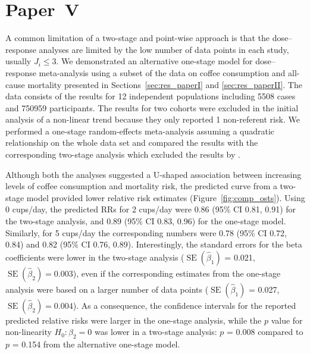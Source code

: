 \documentclass[11pt,a4paper,twoside,openany]{book}\usepackage{knitr}
\DeclareMathOperator{\SE}{SE}
\begin{document}
{\section{Paper~V}



A common limitation of a two-stage and point-wise approach is that the dose--response analyses are limited by the low number of data points in each study, usually $J_i \le 3$. We demonstrated an alternative one-stage model for dose--response meta-analysis using a subset of the data on coffee consumption and all-cause mortality presented in Sections~\ref{sec:res_paperI} and \ref{sec:res_paperII}. The data consists of the results for 12 independent populations including 5508 cases and 750959 participants. The results for two cohorts \citep{nilsson2012traditional} were excluded in the initial analysis of a non-linear trend because they only reported 1 non-referent risk. We performed a one-stage random-effects meta-analysis assuming a quadratic relationship on the whole data set and compared the results with the corresponding two-stage analysis which excluded the results by \cite{nilsson2012traditional}. 

\noindent Although both the analyses suggested a U-shaped association between increasing levels of coffee consumption and mortality risk, the predicted curve from a two-stage model provided lower relative risk estimates (Figure~\ref{fig:comp_osts}). Using 0 cups/day, the predicted RRs for 2 cups/day were 0.86 (95\% CI 0.81, 0.91) for the two-stage analysis, and 0.89 (95\% CI 0.83, 0.96) for the one-stage model. Similarly, for 5 cups/day the corresponding numbers were 0.78 (95\% CI 0.72, 0.84) and 0.82 (95\% CI 0.76, 0.89). Interestingly, the standard errors for the beta coefficients were lower in the two-stage analysis ($\SE \left(\hat \beta_1 \right)$ = 0.021, $\SE \left(\hat \beta_2 \right) = 0.003$), even if the corresponding estimates from the one-stage analysis were based on a larger number of data points ($\SE \left(\hat \beta_1 \right)$ = 0.027, $\SE \left(\hat \beta_2 \right) = 0.004$). As a consequence, the confidence intervals for the reported predicted relative risks were larger in the one-stage analysis, while the $p$ value for non-linearity $H_0: \beta_2 = 0$ was lower in a two-stage analysis: $p$ = 0.008 compared to $p$ = 0.154 from the alternative one-stage model.

\begin{knitrout}\footnotesize
{}\color{fgcolor}\begin{figure}[ht!]


\end{figure}
\end{knitrout}}
\end{document}
